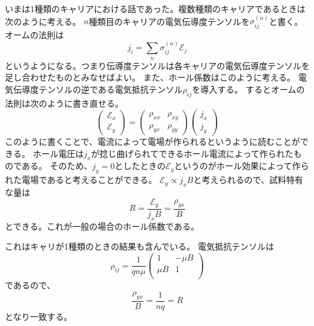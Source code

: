 \documentclass[11pt,dvipdfmx,a4paper]{jsarticle}
\numberwithin{equation}{section}
\begin{document}
いまは1種類のキャリアにおける話であった。複数種類のキャリアであるときは次のように考える。
\(n\)種類目のキャリアの電気伝導度テンソルを\(\sigma_{ij}^{(n)}\)と書く。
オームの法則は
\begin{equation}
	j_i = \sum_n \sigma_{ij}^{(n)}\mathscr{E}_j
\end{equation}
というようになる。つまり伝導度テンソルは各キャリアの電気伝導度テンソルを足し合わせたものとみなせばよい。
また、ホール係数はこのように考える。
電気伝導度テンソルの逆である電気抵抗テンソル\(\rho_{ij}\)を導入する。
するとオームの法則は次のように書き直せる。
\begin{equation}
	\begin{pmatrix}
		\mathscr{E}_x\\ \mathscr{E}_y
	\end{pmatrix}
	=
	\begin{pmatrix}
		\rho_{xx} & \rho_{xy}\\
		\rho_{yx} & \rho_{yy}
	\end{pmatrix}
	\begin{pmatrix}
		j_x \\j_y
	\end{pmatrix}
\end{equation}
このように書くことで、電流によって電場が作られるというように読むことができる。
ホール電圧は\(j_x\)が捻じ曲げられてできるホール電流によって作られたものである。
そのため、\(j_y=0\)としたときの\(\mathscr{E}_y\)というのがホール効果によって作られた電場であると考えることができる。
\(\mathscr{E}_y \propto j_x B\)と考えられるので、試料特有な量は
\begin{equation}
	R = \frac{\mathscr{E}_y}{j_x B} = \frac{\rho_{yx}}{B}
\end{equation}
とできる。これが一般の場合のホール係数である。

これはキャリが1種類のときの結果も含んでいる。
電気抵抗テンソルは
\begin{equation}
	\rho_{ij} = \frac{1}{qn\mu}
	\begin{pmatrix}
		1 & -\mu B\\
		\mu B & 1\\
	\end{pmatrix}
\end{equation}
であるので、
\begin{equation}
	\frac{\rho_{yx}}{B} = \frac{1}{nq} = R
\end{equation}
となり一致する。
\end{document}
